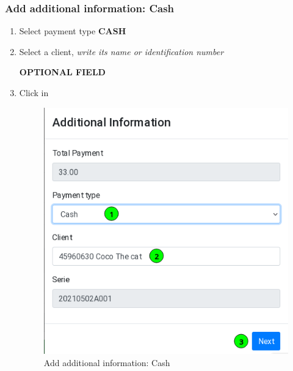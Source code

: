 \documentclass[a4paper,11pt]{refart}
\begin{document}
\subsubsection{Add additional information: Cash}
\begin{enumerate}
	\item Select payment type \textbf{CASH}	
	\item Select a client, \emph{write its name or identification number}
	\medskip
	\begin{leftbar}
		\textbf{OPTIONAL FIELD}
	\end{leftbar}
	\item Click in  	
	\medskip
	\begin{figure}[H]\centering
		\includegraphics[width=\textwidth]{images/sellinvoice-6}
		\caption{Add additional information: Cash}\label{fig:sellinvoice-6}
	\end{figure}
\end{enumerate}
\end{document}
